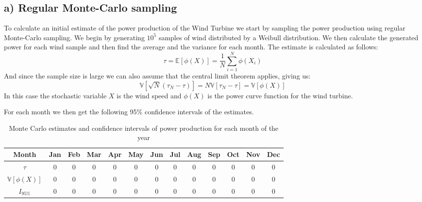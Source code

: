 \documentclass[a4paper]{article}
\begin{document}
\subsection*{a) Regular Monte-Carlo sampling}
To calculate an initial estimate of the power production of the Wind Turbine we start by sampling the power production using regular Monte-Carlo sampling. We begin by generating $10^5$ samples of wind distributed by a Weibull distribution. We then calculate the generated power for each wind sample and then find the average and the variance for each month. The estimate is calculated as follows:
\begin{equation}
    \tau = \mathbb{E}[\phi(X)] = \frac{1}{N}\sum_{i = 1}^N\phi(X_i)
\end{equation}
And since the sample size is large we can also assume that the central limit theorem applies, giving us:
\begin{equation}
    \mathbb{V}[\sqrt{N}(\tau_N-\tau)] = N\mathbb{V}[\tau_N-\tau] = \mathbb{V}[\phi(X)]
\end{equation}
In this case the stochastic variable $X$ is the wind speed and $\phi(X)$ is the power curve function for the wind turbine.

For each month we then get the following 95\% confidence intervals of the estimates.

\begin{center}
    \begin{table}
        \caption{Monte Carlo estimates and confidence intervals of power production for each month of the year}
        \label{MCresults}
        \begin{tabular}{|c|| c c c c c c c c c c c c ||}
            \hline
            Month & Jan & Feb & Mar & Apr & May & Jun & Jul & Aug & Sep & Oct & Nov & Dec \\
            \hline\hline
            $\tau$ & 0 & 0 & 0 & 0 & 0 & 0 & 0 & 0 & 0 & 0 & 0 & 0 \\
            \hline
            $\mathbb{V}[\phi(X)]$ & 0 & 0 & 0 & 0 & 0 & 0 & 0 & 0 & 0 & 0 & 0 & 0\\
            \hline
            $I_{95\%}$ & 0 & 0 & 0 & 0 & 0 & 0 & 0 & 0 & 0 & 0 & 0 & 0\\
            \hline

        \end{tabular}
    \end{table}
\end{center}
\end{document}
